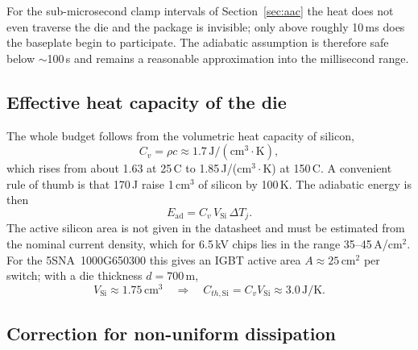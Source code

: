 \documentclass[11pt,a4paper]{article}
\begin{document}
For the sub-microsecond clamp intervals of Section~\ref{sec:aac} the
heat does not even traverse the die and the package is invisible; only
above roughly 10\,ms does the baseplate begin to participate. The
adiabatic assumption is therefore safe below $\sim$100\,\textmu s and
remains a reasonable approximation into the millisecond range.

\subsection{Effective heat capacity of the die}

The whole budget follows from the volumetric heat capacity of silicon,
%
\begin{equation}
  C_v = \rho c \approx 1.7\,\mathrm{J/(cm^3 \cdot K)},
  \label{eq:Cv}
\end{equation}
%
which rises from about 1.63 at 25\,\textdegree C to 1.85\,J/(cm$^3\cdot$K)
at 150\,\textdegree C. A convenient rule of thumb is that 170\,J raise
1\,cm$^3$ of silicon by 100\,K. The adiabatic energy is then
%
\begin{equation}
  E_{\mathrm{ad}} = C_v\,V_{\mathrm{Si}}\,\Delta T_j .
  \label{eq:Ead}
\end{equation}
%
The active silicon area is not given in the datasheet \cite{ds5sna} and
must be estimated from the nominal current density, which for 6.5\,kV
chips lies in the range 35--45\,A/cm$^2$. For the 5SNA~1000G650300 this
gives an IGBT active area $A\approx25$\,cm$^2$ per switch; with a die
thickness $d = 700$\,\textmu m,
%
\begin{equation}
  V_{\mathrm{Si}} \approx 1.75\,\mathrm{cm^3}
  \quad\Longrightarrow\quad
  C_{th,\mathrm{Si}} = C_v V_{\mathrm{Si}} \approx 3.0\,\mathrm{J/K}.
  \label{eq:Cth}
\end{equation}

\subsection{Correction for non-uniform dissipation}
\end{document}
